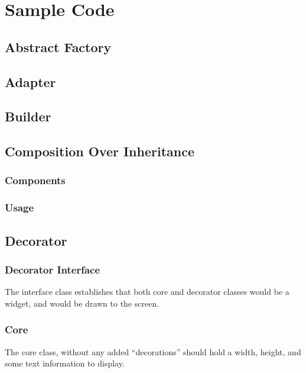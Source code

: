 \section{Sample Code}

\subsection{Abstract Factory}
\label{code:abstract-factory}

\subsection{Adapter}
\label{code:adapter}

\subsection{Builder}
\label{code:builder}

\subsection{Composition Over Inheritance}
\subsubsection{Components}
\label{code:coi-component}
\subsubsection{Usage}
\label{code:coi-usage}

\subsection{Decorator}\label{code:decorator}
\subsubsection{Decorator Interface}
The interface class establishes that both core and decorator classes would be a widget, and would be drawn to the screen.

\subsubsection{Core}
The core class, without any added ``decorations'' should hold a width, height, and some text information to display.

